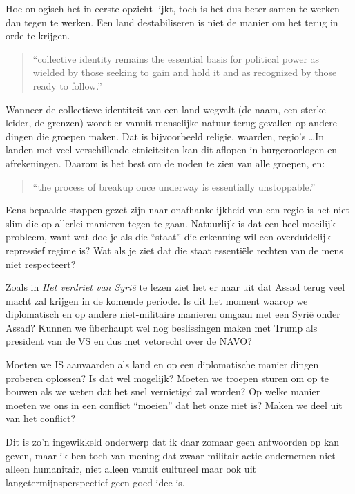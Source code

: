 \documentclass[a4paper]{article}
\begin{document}
Hoe onlogisch het in eerste opzicht lijkt, toch is het dus beter samen te werken dan tegen te werken. Een land destabiliseren is niet de manier om het terug in orde te krijgen.

\begin{quote}
  ``collective identity remains the essential basis for political power as wielded by those seeking to gain and hold it and as recognized by those ready to follow.'' \cite{transconflict}
\end{quote}

Wanneer de collectieve identiteit van een land wegvalt (de naam, een sterke leider, de grenzen) wordt er vanuit menselijke natuur terug gevallen op andere dingen die groepen maken. Dat is bijvoorbeeld religie, waarden, regio's \dots In landen met veel verschillende etniciteiten kan dit aflopen in burgeroorlogen en afrekeningen. Daarom is het best om de noden te zien van alle groepen, en:

\begin{quote}
  ``the process of breakup once underway is essentially unstoppable.'' \cite{transconflict}
\end{quote}

Eens bepaalde stappen gezet zijn naar onafhankelijkheid van een regio is het niet slim die op allerlei manieren tegen te gaan. Natuurlijk is dat een heel moeilijk probleem, want wat doe je als die ``staat'' die erkenning wil een overduidelijk repressief regime is? Wat als je ziet dat die staat essentiële rechten van de mens niet respecteert?

Zoals in \emph{Het verdriet van Syrië} \cite{verdriet} te lezen ziet het er naar uit dat Assad terug veel macht zal krijgen in de komende periode. Is dit het moment waarop we diplomatisch en op andere niet-militaire manieren omgaan met een Syrië onder Assad? Kunnen we überhaupt wel nog beslissingen maken met Trump als president van de VS en dus met vetorecht over de NAVO?

Moeten we IS aanvaarden als land en op een diplomatische manier dingen proberen oplossen? Is dat wel mogelijk? Moeten we troepen sturen om op te bouwen als we weten dat het snel vernietigd zal worden? Op welke manier moeten we ons in een conflict ``moeien'' dat het onze niet is? Maken we deel uit van het conflict?

Dit is zo'n ingewikkeld onderwerp dat ik daar zomaar geen antwoorden op kan geven, maar ik ben toch van mening dat zwaar militair actie ondernemen niet alleen humanitair, niet alleen vanuit cultureel maar ook uit langetermijnsperspectief geen goed idee is.
\end{document}
